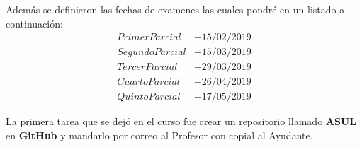 \documentclass[a4paper, 11pt, oneside]{article}
\begin{document}
Además se definieron las fechas de examenes las cuales pondré en un listado a continuación:
\begin{align*}
 Primer Parcial &- 15/02/2019\\
 Segundo Parcial &- 15/03/2019\\
 Tercer Parcial &- 29/03/2019\\
 Cuarto Parcial &- 26/04/2019\\
 Quinto Parcial &- 17/05/2019
\end{align*}

La primera tarea que se dejó en el curso fue crear un repositorio llamado \textbf{ASUL} en \textbf{GitHub} y mandarlo por correo al Profesor con copial al Ayudante.
\end{document}
